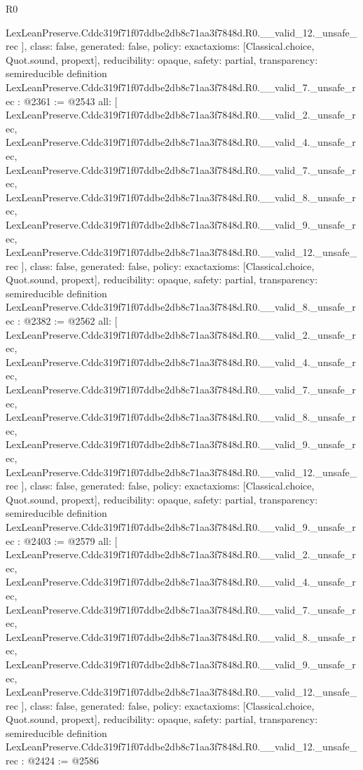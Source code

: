 \begin{lexlean}{R0}
\begin{coremodule}
{    LexLeanPreserve.Cddc319f71f07ddbe2db8c71aa3f7848d.R0.__valid_12._unsafe_rec
  ],
  class: false,
  generated: false,
  policy: exact{axioms: [Classical.choice, Quot.sound, propext]},
  reducibility: opaque{},
  safety: partial,
  transparency: semireducible
}
definition LexLeanPreserve.Cddc319f71f07ddbe2db8c71aa3f7848d.R0.__valid_7._unsafe_rec : @2361 := @2543 {
  all: [
    LexLeanPreserve.Cddc319f71f07ddbe2db8c71aa3f7848d.R0.__valid_2._unsafe_rec,
    LexLeanPreserve.Cddc319f71f07ddbe2db8c71aa3f7848d.R0.__valid_4._unsafe_rec,
    LexLeanPreserve.Cddc319f71f07ddbe2db8c71aa3f7848d.R0.__valid_7._unsafe_rec,
    LexLeanPreserve.Cddc319f71f07ddbe2db8c71aa3f7848d.R0.__valid_8._unsafe_rec,
    LexLeanPreserve.Cddc319f71f07ddbe2db8c71aa3f7848d.R0.__valid_9._unsafe_rec,
    LexLeanPreserve.Cddc319f71f07ddbe2db8c71aa3f7848d.R0.__valid_12._unsafe_rec
  ],
  class: false,
  generated: false,
  policy: exact{axioms: [Classical.choice, Quot.sound, propext]},
  reducibility: opaque{},
  safety: partial,
  transparency: semireducible
}
definition LexLeanPreserve.Cddc319f71f07ddbe2db8c71aa3f7848d.R0.__valid_8._unsafe_rec : @2382 := @2562 {
  all: [
    LexLeanPreserve.Cddc319f71f07ddbe2db8c71aa3f7848d.R0.__valid_2._unsafe_rec,
    LexLeanPreserve.Cddc319f71f07ddbe2db8c71aa3f7848d.R0.__valid_4._unsafe_rec,
    LexLeanPreserve.Cddc319f71f07ddbe2db8c71aa3f7848d.R0.__valid_7._unsafe_rec,
    LexLeanPreserve.Cddc319f71f07ddbe2db8c71aa3f7848d.R0.__valid_8._unsafe_rec,
    LexLeanPreserve.Cddc319f71f07ddbe2db8c71aa3f7848d.R0.__valid_9._unsafe_rec,
    LexLeanPreserve.Cddc319f71f07ddbe2db8c71aa3f7848d.R0.__valid_12._unsafe_rec
  ],
  class: false,
  generated: false,
  policy: exact{axioms: [Classical.choice, Quot.sound, propext]},
  reducibility: opaque{},
  safety: partial,
  transparency: semireducible
}
definition LexLeanPreserve.Cddc319f71f07ddbe2db8c71aa3f7848d.R0.__valid_9._unsafe_rec : @2403 := @2579 {
  all: [
    LexLeanPreserve.Cddc319f71f07ddbe2db8c71aa3f7848d.R0.__valid_2._unsafe_rec,
    LexLeanPreserve.Cddc319f71f07ddbe2db8c71aa3f7848d.R0.__valid_4._unsafe_rec,
    LexLeanPreserve.Cddc319f71f07ddbe2db8c71aa3f7848d.R0.__valid_7._unsafe_rec,
    LexLeanPreserve.Cddc319f71f07ddbe2db8c71aa3f7848d.R0.__valid_8._unsafe_rec,
    LexLeanPreserve.Cddc319f71f07ddbe2db8c71aa3f7848d.R0.__valid_9._unsafe_rec,
    LexLeanPreserve.Cddc319f71f07ddbe2db8c71aa3f7848d.R0.__valid_12._unsafe_rec
  ],
  class: false,
  generated: false,
  policy: exact{axioms: [Classical.choice, Quot.sound, propext]},
  reducibility: opaque{},
  safety: partial,
  transparency: semireducible
}
definition LexLeanPreserve.Cddc319f71f07ddbe2db8c71aa3f7848d.R0.__valid_12._unsafe_rec : @2424 := @2586 {
}
\end{coremodule}
\end{lexlean}
